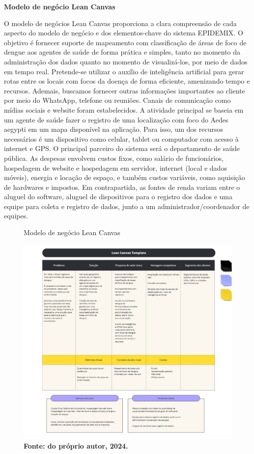 \vspace{12pt}

\textbf{Modelo de negócio Lean Canvas}\newline

O modelo de negócios Lean Canvas proporciona a clara compreensão de cada aspecto do modelo de negócio e dos elementos-chave do sistema EPIDEMIX. O objetivo é fornecer suporte de mapeamento com classificação de áreas de foco de dengue aos agentes de saúde de forma prática e simples, tanto no momento da administração dos dados quanto no momento de visualizá-los, por meio de dados em tempo real. Pretende-se utilizar o auxílio de inteligência artificial para gerar rotas entre os locais com focos da doença de forma eficiente, amenizando tempo e recursos. Ademais, buscamos fornecer outras informações importantes ao cliente por meio do WhatsApp, telefone ou reuniões. Canais de comunicação como mídias sociais e website foram estabelecidos. A atividade principal se baseia em um agente de saúde fazer o registro de uma localização com foco do Aedes aegypti em um mapa disponível na aplicação. Para isso, um dos recursos necessários é um dispositivo como celular, tablet ou computador com acesso à internet e GPS. O principal parceiro do sistema será o departamento de saúde pública. As despesas envolvem custos fixos, como salário de funcionários, hospedagem de website e hospedagem em servidor, internet (local e dados móveis), energia e locação de espaço, e também custos variáveis, como aquisição de hardwares e impostos. Em contrapartida, as fontes de renda variam entre o aluguel do software, aluguel de dispositivos para o registro dos dados e uma equipe para coleta e registro de dados, junto a um administrador/coordenador de equipes.

\begin{figure}[H]
    \centering
    \caption{Modelo de negócio Lean Canvas}
    \includegraphics[width=1.0\linewidth]{Illustrations/Lean Canvas_Epidemix.pdf}
    \caption*{\textbf{Fonte: do próprio autor, 2024.}}
\end{figure}

\vspace{12pt}
